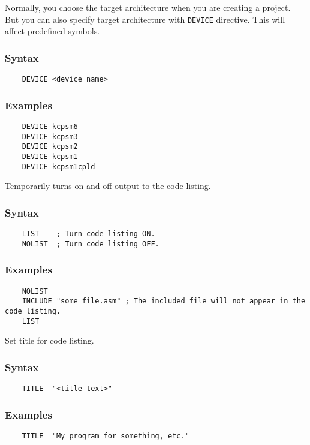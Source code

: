     Normally, you choose the target architecture when you are creating a project. But you can also specify target architecture with \texttt{DEVICE} directive. This will affect predefined symbols.

    \subsubsection{Syntax}
        \verb'    DEVICE <device_name>'

    \subsubsection{Examples}
        \verb'    DEVICE kcpsm6'\\
        \verb'    DEVICE kcpsm3'\\
        \verb'    DEVICE kcpsm2'\\
        \verb'    DEVICE kcpsm1'\\
        \verb'    DEVICE kcpsm1cpld'

    Temporarily turns on and off output to the code listing.

    \subsubsection{Syntax}
        \verb'    LIST    ; Turn code listing ON.'\\
        \verb'    NOLIST  ; Turn code listing OFF.'

    \subsubsection{Examples}
        \verb'    NOLIST'\\
        \verb'    INCLUDE "some_file.asm" ; The included file will not appear in the code listing.'\\
        \verb'    LIST'

    Set title for code listing.

    \subsubsection{Syntax}
        \verb'    TITLE  "<title text>"'

    \subsubsection{Examples}
        \verb'    TITLE  "My program for something, etc."'

